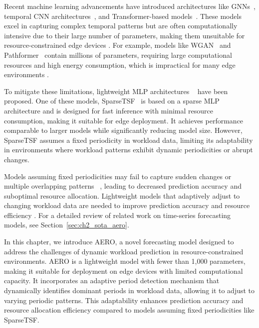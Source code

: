 Recent machine learning advancements have introduced architectures like \acp{GNN}~\cite{yi2024fouriergnn}, temporal \ac{CNN} architectures~\cite{donghao2024moderntcn}, and Transformer-based models~\cite{gort2024forecasting}. These models excel in capturing complex temporal patterns but are often computationally intensive due to their large number of parameters, making them unsuitable for resource-constrained edge devices \cite{meuser2024revisiting}. For example, models like \ac{WGAN}~\cite{arbat2022wassersteinadversarialtransformercloud} and Pathformer~\cite{pathformer2024} contain millions of parameters, requiring large computational resources and high energy consumption, which is impractical for many edge environments \cite{kong2022edge}.

To mitigate these limitations, lightweight \ac{MLP} architectures ~\cite{ekambaram2023tsmixer} have been proposed. One of these models, \ac{SparseTSF}~\cite{sparseTSF} is based on a sparse \ac{MLP} architecture and is designed for fast inference with minimal resource consumption, making it suitable for edge deployment. It achieves performance comparable to larger models while significantly reducing model size. However, \ac{SparseTSF} assumes a fixed periodicity in workload data, limiting its adaptability in environments where workload patterns exhibit dynamic periodicities or abrupt changes.

Models assuming fixed periodicities may fail to capture sudden changes or multiple overlapping patterns ~\cite{sparseTSF}, leading to decreased prediction accuracy and suboptimal resource allocation. Lightweight models that adaptively adjust to changing workload data are needed to improve prediction accuracy and resource efficiency \cite{fan2019urbanedge}. For a detailed review of related work on time-series forecasting models, see Section~\ref{sec:ch2_sota_aero}.

In this chapter, we introduce \ac{AERO}, a novel forecasting model designed to address the challenges of dynamic workload prediction in resource-constrained environments. \ac{AERO} is a lightweight model with fewer than 1,000 parameters, making it suitable for deployment on edge devices with limited computational capacity. It incorporates an adaptive period detection mechanism that dynamically identifies dominant periods in workload data, allowing it to adjust to varying periodic patterns. This adaptability enhances prediction accuracy and resource allocation efficiency compared to models assuming fixed periodicities like \ac{SparseTSF}.

